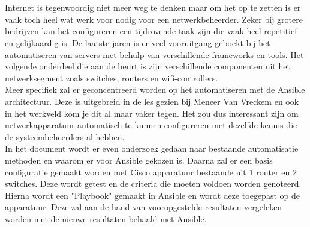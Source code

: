 


\chapter*{}

Internet is tegenwoordig niet meer weg te denken maar om het op te zetten is er vaak toch heel wat werk voor nodig voor een netwerkbeheerder. Zeker bij grotere bedrijven kan het configureren een tijdrovende taak zijn die vaak heel repetitief en gelijkaardig is. De laatste jaren is er veel vooruitgang geboekt bij het automatiseren van servers met behulp van verschillende frameworks en tools. Het volgende onderdeel die aan de beurt is zijn verschillende componenten uit het netwerksegment zoals switches, routers en wifi-controllers. 
\\

Meer specifiek zal er geconcentreerd worden op het automatiseren met de Ansible architectuur. Deze is uitgebreid in de les gezien bij Meneer Van Vreckem en ook in het werkveld kom je dit al maar vaker tegen. Het zou dus interessant zijn om netwerkapparatuur automatisch te kunnen configureren met dezelfde kennis die de systeembeheerders al hebben. 
\\

In het document wordt er even onderzoek gedaan naar bestaande automatisatie methoden en waarom er voor Ansible gekozen is. Daarna zal er een basis configuratie gemaakt worden met Cisco apparatuur bestaande uit 1 router en 2 switches. Deze wordt getest en de criteria die moeten voldoen worden genoteerd. Hierna wordt een "Playbook" gemaakt in Ansible en wordt deze toegepast op de apparatuur. Deze zal aan de hand van vooropgestelde resultaten vergeleken worden met de nieuwe resultaten behaald met Ansible. 

  